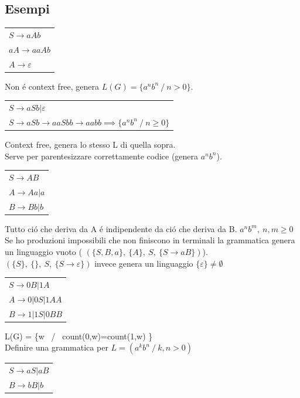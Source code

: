 \subsection{Esempi}
\begin{tabular}{l}
	$S \rightarrow aAb$\\
	$aA \rightarrow aaAb$\\
	$A \rightarrow \varepsilon$\\
\end{tabular}
Non \'e context free, genera $L(G) = \{ a^nb^n\ / \ n>0 \}$.\\[5pt]
\begin{tabular}{l}
	$S \rightarrow aSb | \varepsilon$\\
	$S \rightarrow aSb \rightarrow aaSbb \rightarrow aabb \implies \{a^nb^n\ / \ n \geq 0 \} $ \\
\end{tabular}
Context free, genera lo stesso L di quella sopra.\\
Serve per parentesizzare correttamente codice (genera $a^n b^n$).\\[5pt]
\begin{tabular}{l}
$S \rightarrow AB$\\
$A \rightarrow Aa|a$\\
$B \rightarrow Bb|b$\\
\end{tabular}
Tutto ci\'o che deriva da A \'e indipendente da ci\'o che deriva da B. ${a^{n}b^{m},\ n, m \geq 0}$\\[5pt]
Se ho produzioni impossibili che non finiscono in terminali la grammatica genera un linguaggio vuoto (
$(\{ S, B, a \},\ \{ A \} ,\ S,\ \{ S\rightarrow aB \})$).\\[5pt]
$(\{ S\} ,\ \{ \},\ S,\ \{ S \rightarrow \varepsilon \} )$ invece genera un linguaggio $\{ \varepsilon \} \not = \emptyset $\\[5pt]
\begin{tabular}{l}
$S \rightarrow 0B | 1A$\\
$A \rightarrow 0|0S|1AA$\\
$B \rightarrow 1|1S|0BB$\\
\end{tabular}
L(G) = \{w \ / \ count(0,w)=count(1,w) \}\\[5pt]
Definire una grammatica per $L = (a^kb^n \ / \ k, n > 0)$\\
\begin{tabular}{l}
	$S \rightarrow aS|aB$\\
	$B \rightarrow bB|b$\\
\end{tabular}
